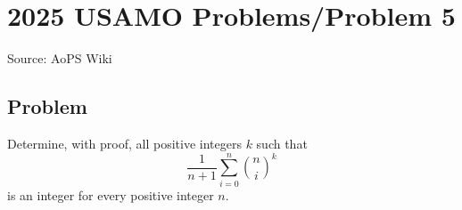 \documentclass[12pt]{article}
\begin{document}
\section*{{2025 USAMO Problems/Problem 5}}
Source: AoPS Wiki

\subsection*{Problem}
Determine, with proof, all positive integers $k$ such that \[\frac{1}{n+1} \sum_{i=0}^n \binom{n}{i}^k\] is an integer for every positive integer $n.$
\end{document}
